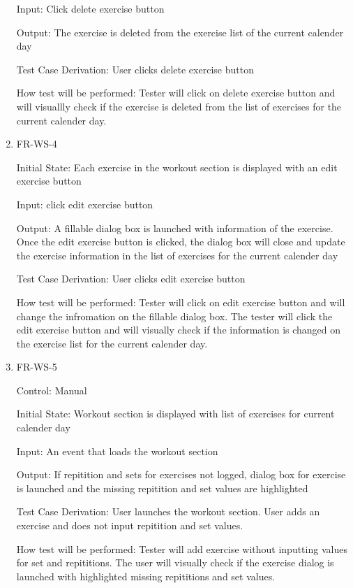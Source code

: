 \documentclass[12pt, titlepage]{article}
\begin{document}
\begin{enumerate}
	Input: Click delete exercise button
	
	Output: The exercise is deleted from the exercise list of the current calender day
	
	Test Case Derivation: User clicks delete exercise button
	
	How test will be performed: Tester will click on delete exercise button and will visuallly check if the exercise is deleted from the list of exercises for the current calender day. 
	
	\item{FR-WS-4\\}
	
	Initial State: Each exercise in the workout section is displayed with an edit exercise button
	
	Input: click edit exercise button
	
	Output: A fillable dialog box is launched with information of the exercise. Once the edit exercise button is clicked, the dialog box will close and update the exercise information in the list of exercises for the current calender day
	
	Test Case Derivation: User clicks edit exercise button
	
	How test will be performed: Tester will click on edit exercise button and will change the infromation on the fillable dialog box. The tester will click the edit exercise button and will visually check if the information is changed on the exercise list for the current calender day.
	
	\item{FR-WS-5\\}
	
	Control: Manual
	
	Initial State: Workout section is displayed with list of exercises for current calender day
	
	Input: An event that loads the workout section
	
	Output: If repitition and sets for exercises not logged, dialog box for exercise is launched and the missing repitition and set values are highlighted
	
	Test Case Derivation: User launches the workout section. User adds an exercise and does not input repitition and set values.
	
	How test will be performed: Tester will add exercise without inputting values for set and repititions. The user will visually check if the exercise dialog is launched with highlighted missing repititions and set values.
	
\end{enumerate}
\end{document}
